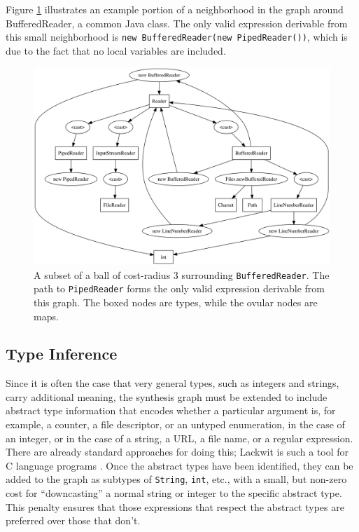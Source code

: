 Figure \ref{examplegraph} illustrates an example portion of a neighborhood in the graph around BufferedReader, a common Java class. The only valid expression derivable from this small neighborhood is \lstinline{new BufferedReader(new PipedReader())}, which is due to the fact that no local variables are included.

\begin{figure}[!htb]
\centering
\includegraphics[width=\linewidth]{exampleGraph}
\caption{A subset of a ball of cost-radius $3$ surrounding \texttt{BufferedReader}. The path to \texttt{PipedReader} forms the only valid expression derivable from this graph. The boxed nodes are types, while the ovular nodes are maps.\label{examplegraph}}
\end{figure}

\subsection{Type Inference}

Since it is often the case that very general types, such as integers and strings, carry additional meaning, the synthesis graph must be extended to include abstract type information that encodes whether a particular argument is, for example, a counter, a file descriptor, or an untyped enumeration, in the case of an integer, or in the case of a string, a URL, a file name, or a regular expression. There are already standard approaches for doing this; Lackwit is such a tool for C language programs \cite{DBLP:conf/icse/OCallahanJ97}. Once the abstract types have been identified, they can be added to the graph as subtypes of \texttt{String}, \texttt{int}, etc., with a small, but non-zero cost for ``downcasting'' a normal string or integer to the specific abstract type. This penalty ensures that those expressions that respect the abstract types are preferred over those that don't.

